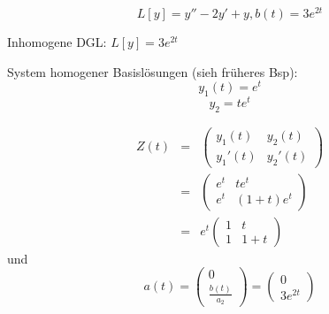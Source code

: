 \documentclass[10pt,a4paper]{article}
\begin{document}
\begin{bsp}[$y''-2y'+y = 3e^{2t}$]
$$L[y]=y''-2y'+y, b(t)=3e^{2t}$$

Inhomogene DGL: $L[y]=3e^{2t}$

System homogener Basislösungen (sieh früheres Bsp): $$y_1(t)=e^{t}$$
$$y_2=te^{t}$$

\begin{eqnarray*}
Z(t)&=&\begin{pmatrix}
y_1(t) & y_2(t) \\
y_1'(t) & y_2'(t)
\end{pmatrix} \\
&=& \begin{pmatrix}
e^{t} & t e^{t}\\
e^{t} & (1+t)e^{t}
\end{pmatrix}\\
& =& e^{t} \begin{pmatrix}
1 & t\\
1 & 1+t
\end{pmatrix}
\end{eqnarray*}
und
\begin{equation*}
 a(t)=\begin{pmatrix}
0 \\ \frac{b(t)}{a_2}
\end{pmatrix} =\begin{pmatrix}
0 \\ 3e^{2t}
\end{pmatrix}
\end{equation*}


\end{bsp}
\end{document}

